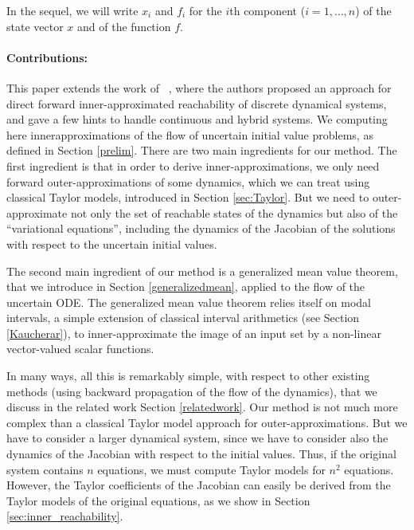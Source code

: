 \documentclass{sig-alternate-05-2015} %
\newcommand\ForAuthors[1]%
 {\par\smallskip                     %
  \begin{center}%
   \fbox%
   {\parbox{0.9\linewidth}%
    {\raggedright\sc--- #1}%
   }%
  \end{center}%
  \par\smallskip                     %
 }
\begin{document}
In the sequel, we will write $x_i$ and $f_i$ for the $i$th component ($i=1,\ldots,n$) of
the state vector $x$ and of the function $f$. 

\paragraph{Contributions:}

This paper extends the work of ~\cite{sas07,hscc14}, where the authors proposed an approach for direct forward inner-approximated reachability of 
discrete dynamical systems, and gave a few hints to handle continuous and hybrid systems. 
We computing here inner\-approximations of the flow of uncertain initial value problems, as defined in Section \ref{prelim}. 
There are two main ingredients for our method. The first ingredient is that in order to derive inner-approximations, we only need forward 
outer-approxima\-tions of some dynamics, which we can treat using classical
Taylor models, introduced in Section \ref{sec:Taylor}. But we need to outer-approximate not only 
the set of reachable states of the dynamics but also
of the ``variational equations'', including the dynamics of the Jacobian of the solutions with respect to the uncertain
initial values. 

The second main ingredient of our method is 
a generalized mean value theorem, that we introduce in Section \ref{generalizedmean}, applied to the flow of the uncertain ODE. 
The generalized mean value theorem relies itself on modal intervals, a simple 
extension of classical interval arithmetics (see Section \ref{Kaucherar}), to inner-approximate 
the image of an input set by a non-linear vector-valued scalar functions. 

In many ways, all this is remarkably simple, with respect to other existing methods (using backward propagation
of the flow of the dynamics), that we discuss in the related work Section \ref{relatedwork}. Our method
is not much more complex than a classical Taylor model approach for outer-approximations. 
But we have to consider a larger dynamical system, since we have to consider also the dynamics of the Jacobian with respect to the initial values.
Thus, if the original system contains $n$ equations, we must compute Taylor models for $n^2$ equations. However, the Taylor coefficients of the Jacobian 
can easily be derived from the Taylor models of the original equations, as we show in Section \ref{sec:inner_reachability}.  
\end{document}
